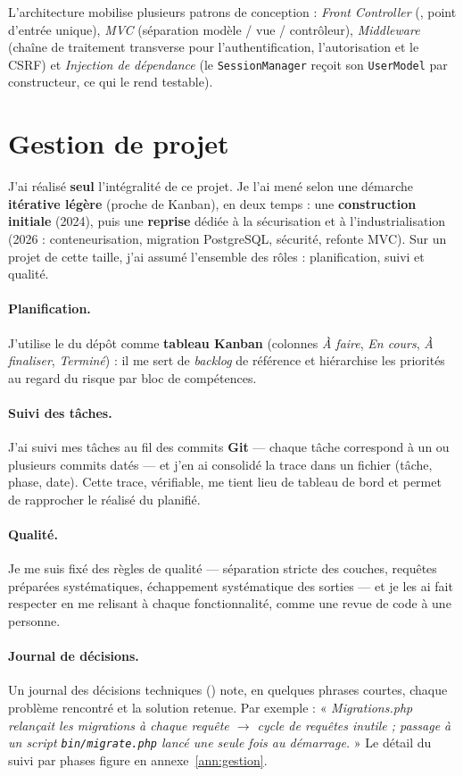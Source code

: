 L'architecture mobilise plusieurs patrons de conception : \emph{Front Controller}
(, point d'entrée unique), \emph{MVC} (séparation modèle / vue /
contrôleur), \emph{Middleware} (chaîne de traitement transverse pour l'authentification,
l'autorisation et le CSRF) et \emph{Injection de dépendance} (le \texttt{SessionManager} reçoit
son \texttt{UserModel} par constructeur, ce qui le rend testable).

\section{Gestion de projet}
\label{sec:gestion}

J'ai réalisé \textbf{seul} l'intégralité de ce projet. Je l'ai mené selon une démarche
\textbf{itérative légère} (proche de Kanban), en deux temps : une \textbf{construction initiale}
(2024), puis une \textbf{reprise} dédiée à la sécurisation et à l'industrialisation (2026 :
conteneurisation, migration PostgreSQL, sécurité, refonte MVC). Sur un projet de cette taille,
j'ai assumé l'ensemble des rôles : planification, suivi et qualité.

\paragraph{Planification.} J'utilise le  du dépôt comme \textbf{tableau Kanban}
(colonnes \emph{À faire}, \emph{En cours}, \emph{À finaliser}, \emph{Terminé}) : il me sert de
\emph{backlog} de référence et hiérarchise les priorités au regard du risque par bloc de
compétences.

\paragraph{Suivi des tâches.} J'ai suivi mes tâches au fil des commits \textbf{Git} — chaque
tâche correspond à un ou plusieurs commits datés — et j'en ai consolidé la trace dans un fichier
 (tâche, phase, date). Cette trace, vérifiable, me tient lieu de tableau de bord
et permet de rapprocher le réalisé du planifié.

\paragraph{Qualité.} Je me suis fixé des règles de qualité — séparation stricte des couches,
requêtes préparées systématiques, échappement systématique des sorties — et je les ai fait
respecter en me relisant à chaque fonctionnalité, comme une revue de code à une personne.

\paragraph{Journal de décisions.} Un journal des décisions techniques
() note, en quelques phrases courtes, chaque problème rencontré et la
solution retenue. Par exemple : « \emph{Migrations.php relançait les migrations à chaque requête
$\rightarrow$ cycle de requêtes inutile ; passage à un script \texttt{bin/migrate.php} lancé une
seule fois au démarrage.} » Le détail du suivi par phases figure en annexe~\ref{ann:gestion}.

